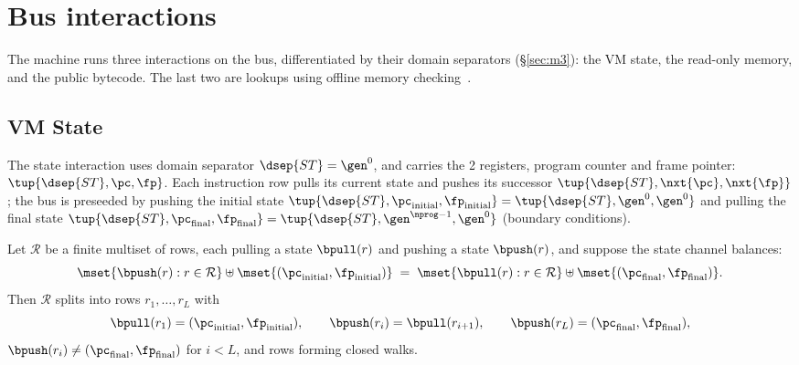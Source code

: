 \section{Bus interactions}\label{sec:omc}

The machine runs three interactions on the bus, differentiated by their domain separators (\S\ref{sec:m3}): the VM state, the read-only memory, and the public bytecode. The last two are lookups using offline memory checking~\cite{BEGKN94}.

\subsection{VM State}\label{sec:state}

The state interaction uses domain separator $\dsep{ST} = \gen^{0}$, and carries the 2 registers, program counter and frame pointer: $\tup{\dsep{ST},\pc,\fp}$. Each instruction row pulls its current state and pushes its successor $\tup{\dsep{ST},\nxt{\pc},\nxt{\fp}}$; the bus is preseeded by pushing the initial state $\tup{\dsep{ST},\pc_{\mathrm{initial}},\fp_{\mathrm{initial}}} = \tup{\dsep{ST},\gen^0,\gen^0}$ and pulling the final state $\tup{\dsep{ST},\pc_{\mathrm{final}},\fp_{\mathrm{final}}} = \tup{\dsep{ST},\gen^{\nprog - 1},\gen^0}$ (boundary conditions).
\begin{proposition}\label{prop:walk}
Let $\mathcal R$ be a finite multiset of rows, each pulling a state $\bpull(r)$ and pushing a state $\bpush(r)$, and suppose the state channel balances:
\[
  \mset{\bpush(r):r\in\mathcal R}\uplus\mset{(\pc_{\mathrm{initial}},\fp_{\mathrm{initial}})}
  \;=\;\mset{\bpull(r):r\in\mathcal R}\uplus\mset{(\pc_{\mathrm{final}},\fp_{\mathrm{final}})} .
\]
Then $\mathcal R$ splits into rows $r_1,\dots,r_L$ with
\[
  \bpull(r_1)=(\pc_{\mathrm{initial}},\fp_{\mathrm{initial}}),\qquad \bpush(r_i)=\bpull(r_{i+1}),\qquad \bpush(r_L)=(\pc_{\mathrm{final}},\fp_{\mathrm{final}}),
\]
$\bpush(r_i)\neq(\pc_{\mathrm{final}},\fp_{\mathrm{final}})$ for $i<L$, and rows forming closed walks.
\end{proposition}

